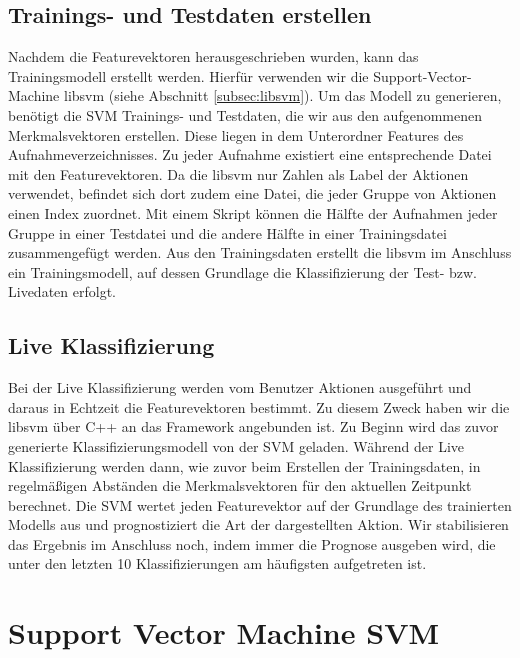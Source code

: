\subsection{Trainings- und Testdaten erstellen}
\label{subsec:trainings-und-testdaten-erstellen}
Nachdem die Featurevektoren herausgeschrieben wurden, kann das Trainingsmodell erstellt werden. Hierfür verwenden wir die Support-Vector-Machine libsvm (siehe Abschnitt \ref{subsec:libsvm}). Um das Modell zu generieren, benötigt die SVM Trainings- und Testdaten, die wir aus den aufgenommenen Merkmalsvektoren erstellen. Diese liegen in dem Unterordner \glqq{}Features\grqq{} des Aufnahmeverzeichnisses. Zu jeder Aufnahme existiert eine entsprechende Datei mit den Featurevektoren. Da die libsvm nur Zahlen als Label der Aktionen verwendet, befindet sich dort zudem eine Datei, die jeder Gruppe von Aktionen einen Index zuordnet. Mit einem Skript können die Hälfte der Aufnahmen jeder Gruppe in einer Testdatei und die andere Hälfte in einer Trainingsdatei zusammengefügt werden. Aus den Trainingsdaten erstellt die libsvm im Anschluss ein Trainingsmodell, auf dessen Grundlage die Klassifizierung der Test- bzw. Livedaten erfolgt.

\subsection{Live Klassifizierung}
Bei der Live Klassifizierung werden vom Benutzer Aktionen ausgeführt und daraus in Echtzeit die Featurevektoren bestimmt. Zu diesem Zweck haben wir die libsvm über C++ an das Framework angebunden ist. Zu Beginn wird das zuvor generierte Klassifizierungsmodell von der SVM geladen. Während der Live Klassifizierung werden dann, wie zuvor beim Erstellen der Trainingsdaten, in regelmäßigen Abständen die Merkmalsvektoren für den aktuellen Zeitpunkt berechnet. Die SVM wertet jeden Featurevektor auf der Grundlage des trainierten Modells aus und prognostiziert die Art der dargestellten Aktion. Wir stabilisieren das Ergebnis im Anschluss noch, indem immer die Prognose ausgeben wird, die unter den letzten 10 Klassifizierungen am häufigsten aufgetreten ist. 



\section{Support Vector Machine SVM}
\label{sec:support-vector-machine-svm}

